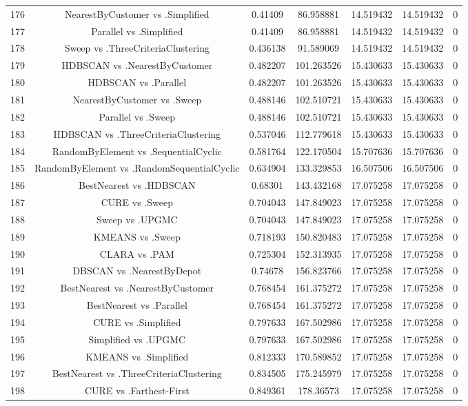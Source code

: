 \documentclass[a4paper,10pt]{article}
\begin{document}
\begin{landscape}
\begin{table}[!htp]
\begin{tabular}{ccccccc}
176&NearestByCustomer vs .Simplified&0.41409&86.958881&14.519432&14.519432&0\\
177&Parallel vs .Simplified&0.41409&86.958881&14.519432&14.519432&0\\
178&Sweep vs .ThreeCriteriaClustering&0.436138&91.589069&14.519432&14.519432&0\\
179&HDBSCAN vs .NearestByCustomer&0.482207&101.263526&15.430633&15.430633&0\\
180&HDBSCAN vs .Parallel&0.482207&101.263526&15.430633&15.430633&0\\
181&NearestByCustomer vs .Sweep&0.488146&102.510721&15.430633&15.430633&0\\
182&Parallel vs .Sweep&0.488146&102.510721&15.430633&15.430633&0\\
183&HDBSCAN vs .ThreeCriteriaClustering&0.537046&112.779618&15.430633&15.430633&0\\
184&RandomByElement vs .SequentialCyclic&0.581764&122.170504&15.707636&15.707636&0\\
185&RandomByElement vs .RandomSequentialCyclic&0.634904&133.329853&16.507506&16.507506&0\\
186&BestNearest vs .HDBSCAN&0.68301&143.432168&17.075258&17.075258&0\\
187&CURE vs .Sweep&0.704043&147.849023&17.075258&17.075258&0\\
188&Sweep vs .UPGMC&0.704043&147.849023&17.075258&17.075258&0\\
189&KMEANS vs .Sweep&0.718193&150.820483&17.075258&17.075258&0\\
190&CLARA vs .PAM&0.725304&152.313935&17.075258&17.075258&0\\
191&DBSCAN vs .NearestByDepot&0.74678&156.823766&17.075258&17.075258&0\\
192&BestNearest vs .NearestByCustomer&0.768454&161.375272&17.075258&17.075258&0\\
193&BestNearest vs .Parallel&0.768454&161.375272&17.075258&17.075258&0\\
194&CURE vs .Simplified&0.797633&167.502986&17.075258&17.075258&0\\
195&Simplified vs .UPGMC&0.797633&167.502986&17.075258&17.075258&0\\
196&KMEANS vs .Simplified&0.812333&170.589852&17.075258&17.075258&0\\
197&BestNearest vs .ThreeCriteriaClustering&0.834505&175.245979&17.075258&17.075258&0\\
198&CURE vs .Farthest-First&0.849361&178.36573&17.075258&17.075258&0\\

\end{tabular}
\end{table}
\end{landscape}
\end{document}
